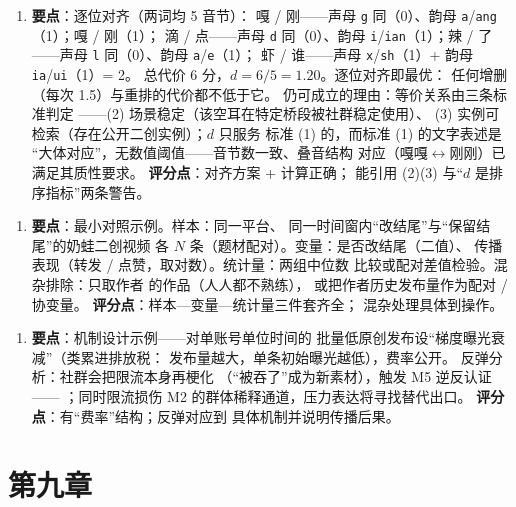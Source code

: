 \begin{enumerate}[label=\textbf{1.},leftmargin=2.6em]
  \item \textbf{要点}：逐位对齐（两词均 5 音节）：
        嘎 / 刚——声母 \texttt{g} 同（0）、韵母
        \texttt{a}/\texttt{ang}（1）；嘎 / 刚（1）；
        滴 / 点——声母 \texttt{d} 同（0）、韵母
        \texttt{i}/\texttt{ian}（1）；辣 / 了——声母
        \texttt{l} 同（0）、韵母 \texttt{a}/\texttt{e}（1）；
        虾 / 谁——声母 \texttt{x}/\texttt{sh}（1）+
        韵母 \texttt{ia}/\texttt{ui}（1）= 2。
        总代价 6 分，$d = 6/5 = 1.20$。逐位对齐即最优：
        任何增删（每次 1.5）与重排的代价都不低于它。
        仍可成立的理由：等价关系由三条标准判定
        ——(2) 场景稳定（该空耳在特定桥段被社群稳定使用）、
        (3) 实例可检索（存在公开二创实例）；$d$ 只服务
        标准 (1) 的，而标准 (1) 的文字表述是
        “大体对应”，无数值阈值——音节数一致、叠音结构
        对应（嘎嘎$\leftrightarrow$刚刚）已满足其质性要求。
        \textbf{评分点}：对齐方案 + 计算正确；
        能引用 (2)(3) 与“$d$ 是排序指标”两条警告。
\end{enumerate}

\begin{enumerate}[label=\textbf{2.},leftmargin=2.6em]
  \item \textbf{要点}：最小对照示例。样本：同一平台、
        同一时间窗内“改结尾”与“保留结尾”的奶蛙二创视频
        各 $N$ 条（题材配对）。变量：是否改结尾（二值）、
        传播表现（转发 / 点赞，取对数）。统计量：两组中位数
        比较或配对差值检验。混杂排除：只取作者
        的作品（人人都不熟练），
        或把作者历史发布量作为配对 / 协变量。
        \textbf{评分点}：样本—变量—统计量三件套齐全；
        混杂处理具体到操作。
\end{enumerate}

\begin{enumerate}[label=\textbf{3.},leftmargin=2.6em]
  \item \textbf{要点}：机制设计示例——对单账号单位时间的
        批量低原创发布设“梯度曝光衰减”（类累进排放税：
        发布量越大，单条初始曝光越低），费率公开。
        反弹分析：社群会把限流本身再梗化
        （“被吞了”成为新素材），触发 M5 逆反认证——
        ；同时限流损伤 M2
        的群体稀释通道，压力表达将寻找替代出口。
        \textbf{评分点}：有“费率”结构；反弹对应到
        具体机制并说明传播后果。
\end{enumerate}

\section{第九章}\label{app:ans:09}

